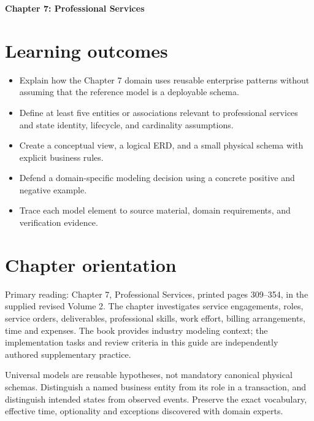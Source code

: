 \documentclass[11pt,letterpaper]{article}
\begin{document}
\begin{center}
{\LARGE\bfseries\color{navy} Chapter 7: Professional Services}\par
\vspace{0.25em}{\large Study guide | concept, critique, design, verify}\par
{}
\end{center}
\vspace{0.8em}
\section{Learning outcomes}
\begin{itemize}
\item Explain how the Chapter 7 domain uses reusable enterprise patterns without assuming that the reference model is a deployable schema.
\item Define at least five entities or associations relevant to professional services and state identity, lifecycle, and cardinality assumptions.
\item Create a conceptual view, a logical ERD, and a small physical schema with explicit business rules.
\item Defend a domain-specific modeling decision using a concrete positive and negative example.
\item Trace each model element to source material, domain requirements, and verification evidence.
\end{itemize}

\section{Chapter orientation}
Primary reading: Chapter 7, Professional Services, printed pages 309--354, in the supplied revised Volume 2. The chapter investigates service engagements, roles, service orders, deliverables, professional skills, work effort, billing arrangements, time and expenses. The book provides industry modeling context; the implementation tasks and review criteria in this guide are independently authored supplementary practice.

Universal models are reusable hypotheses, not mandatory canonical physical schemas. Distinguish a named business entity from its role in a transaction, and distinguish intended states from observed events. Preserve the exact vocabulary, effective time, optionality and exceptions discovered with domain experts.
\end{document}
